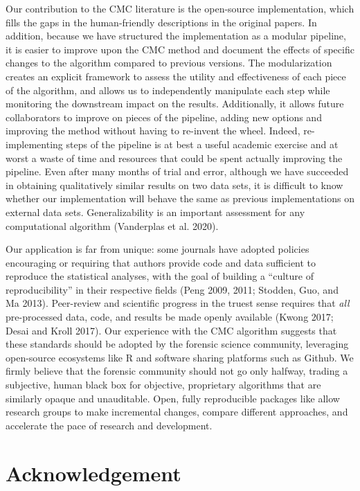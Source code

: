 Our contribution to the CMC literature is the open-source implementation, which fills the gaps in the human-friendly descriptions in the original papers.
In addition, because we have structured the  implementation as a modular pipeline, it is easier to improve upon the CMC method and document the effects of specific changes to the algorithm compared to previous versions.
The modularization creates an explicit framework to assess the utility and effectiveness of each piece of the algorithm, and allows us to independently manipulate each step while monitoring the downstream impact on the results.
Additionally, it allows future collaborators to improve on pieces of the pipeline, adding new options and improving the method without having to re-invent the wheel.
Indeed, re-implementing steps of the pipeline is at best a useful academic exercise and at worst a waste of time and resources that could be spent actually improving the pipeline.
Even after many months of trial and error, although we have succeeded in obtaining qualitatively similar results on two data sets, it is difficult to know whether our implementation will behave the same as previous implementations on external data sets.
Generalizability is an important assessment for any computational algorithm (Vanderplas et al. 2020).

Our application is far from unique: some journals have adopted policies encouraging or requiring that authors provide code and data sufficient to reproduce the statistical analyses, with the goal of building a ``culture of reproducibility'' in their respective fields (Peng 2009, 2011; Stodden, Guo, and Ma 2013).
Peer-review and scientific progress in the truest sense requires that \emph{all} pre-processed data, code, and results be made openly available (Kwong 2017; Desai and Kroll 2017).
Our experience with the CMC algorithm suggests that these standards should be adopted by the forensic science community, leveraging open-source ecosystems like R and software sharing platforms such as Github.
We firmly believe that the forensic community should not go only halfway, trading a subjective, human black box for objective, proprietary algorithms that are similarly opaque and unauditable.
Open, fully reproducible packages like  allow research groups to make incremental changes, compare different approaches, and accelerate the pace of research and development.

\hypertarget{acknowledgement}{%
\section{Acknowledgement}\label{acknowledgement}}

